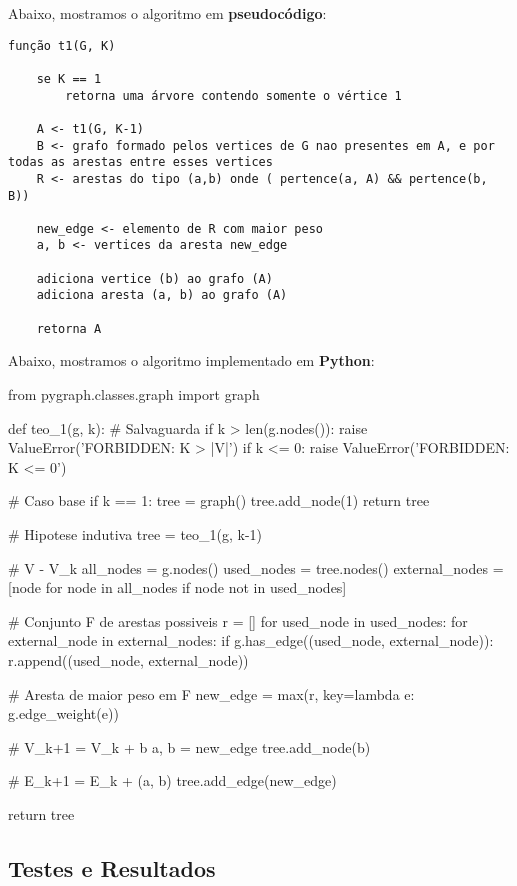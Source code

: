 \documentclass[a4paper]{article}
\begin{document}
Abaixo, mostramos o algoritmo em \textbf{pseudocódigo}:

{\color{ogreen}
\begin{verbatim}
função t1(G, K)

    se K == 1
        retorna uma árvore contendo somente o vértice 1

    A <- t1(G, K-1)
    B <- grafo formado pelos vertices de G nao presentes em A, e por todas as arestas entre esses vertices
    R <- arestas do tipo (a,b) onde ( pertence(a, A) && pertence(b, B))

    new_edge <- elemento de R com maior peso
    a, b <- vertices da aresta new_edge

    adiciona vertice (b) ao grafo (A)
    adiciona aresta (a, b) ao grafo (A)

    retorna A
\end{verbatim}
}

Abaixo, mostramos o algoritmo implementado em \textbf{Python}:

\begin{python}
from pygraph.classes.graph import graph

def teo_1(g, k):
  # Salvaguarda
  if k > len(g.nodes()):
    raise ValueError('FORBIDDEN: K > |V|')
  if k <= 0:
    raise ValueError('FORBIDDEN: K <= 0')

  # Caso base
  if k == 1:
    tree = graph()
    tree.add_node(1)
    return tree

  # Hipotese indutiva
  tree = teo_1(g, k-1)

  # V - V_k
  all_nodes = g.nodes()
  used_nodes = tree.nodes()
  external_nodes = [node for node in all_nodes if node not in used_nodes]

  # Conjunto F de arestas possiveis
  r = []
  for used_node in used_nodes:
    for external_node in external_nodes:
      if g.has_edge((used_node, external_node)):
        r.append((used_node, external_node))

  # Aresta de maior peso em F
  new_edge = max(r, key=lambda e: g.edge_weight(e))

  # V_{k+1} = V_k + {b}
  a, b = new_edge
  tree.add_node(b)

  # E_{k+1} = E_k + {(a, b)}
  tree.add_edge(new_edge)

  return tree
\end{python}

\subsection*{Testes e Resultados}
\end{document}
